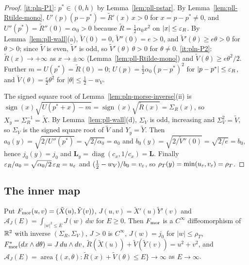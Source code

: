 \begin{proof}
\ref{it:pln-P1}: $p^*\in(0,h)$ by Lemma~\ref{lem:pll-pstar}. By Lemma~\ref{lem:pll-Rtilde-mono},
$U'(p)(p-p^*)=\tilde R'(x)\,x>0$ for $x=p-p^*\ne0$, and $U''(p^*)=\tilde R''(0)=\alpha_0>0$ because
$\tilde R=\frac12\alpha_0x^2$ on $|x|\le\varepsilon_R$. By Lemma~\ref{lem:pll-wall}(a), $\tilde V(0)=0$, $\tilde V''(0)=e>0$,
and $\tilde V'(\theta)\ge e\theta>0$ for $\theta>0$; since $\tilde V$ is even, $\tilde V'$ is odd, so
$\tilde V'(\theta)\,\theta>0$ for $\theta\ne0$. \ref{it:pln-P2}: $\tilde R(x)\to+\infty$ as $x\to\pm\infty$
(Lemma~\ref{lem:pll-Rtilde-mono}) and $\tilde V(\theta)\ge e\theta^2/2$. Further $m=U(p^*)=\tilde R(0)=0$;
$U(p)=\frac12\alpha_0(p-p^*)^2$ for $|p-p^*|\le\varepsilon_R$, and $\tilde V(\theta)=\frac e2\theta^2$ for $|\theta|\le\frac12-w_V$.

The signed square root of Lemma~\ref{lem:pln-morse-inverse}(ii) is
$\operatorname{sign}(x)\sqrt{U(p^*+x)-m}=\operatorname{sign}(x)\sqrt{\tilde R(x)}=\Sigma_R(x)$, so $X_y=\Sigma_R^{-1}=\tilde X$.
By Lemma~\ref{lem:pll-wall}(d), $\Sigma_V$ is odd, increasing and $\Sigma_V^2=\tilde V$, so $\Sigma_V$ is the signed square
root of $\tilde V$ and $Y_y=\tilde Y$. Then $a_0(y)=\sqrt{2/U''(p^*)}=\sqrt{2/\alpha_0}=a_0$ and
$b_0(y)=\sqrt{2/\tilde V''(0)}=\sqrt{2/e}=b_0$, hence $j_0(y)=j_0$ and $\mathbf L_y=\operatorname{diag}(c_x,1/c_x)=\mathbf L$.
Finally $\varepsilon_R/a_0=\sqrt{\alpha_0/2}\,\varepsilon_R=u_\varepsilon$ and $(\frac12-w_V)/b_0=v_\varepsilon$, so
$\rho_T(y)=\min(u_\varepsilon,v_\varepsilon)=\rho_T$.
\end{proof}

\subsection{The inner map}\label{sec:pll-inner-map}

\begin{lemma}\label{lem:pll-morse-density}
Put $F_{\rm mor}(u,v)=(\tilde X(u),\tilde Y(v))$, $J(u,v)=\tilde X'(u)\tilde Y'(v)$ and
$\mathcal A_J(E)=\int_{|w|^2\le E}J(w)\,dw$ for $E\ge0$. Then $F_{\rm mor}$ is a $C^\infty$ diffeomorphism of $\mathbb{R}^2$
with inverse $(\Sigma_R,\Sigma_V)$, $J>0$ is $C^\infty$, $J(w)=j_0$ for $|w|\le\rho_T$,
$F_{\rm mor}^*(dx\wedge d\theta)=J\,du\wedge dv$, $\tilde R(\tilde X(u))+\tilde V(\tilde Y(v))=u^2+v^2$, and
$\mathcal A_J(E)=\operatorname{area}\{(x,\theta):\tilde R(x)+\tilde V(\theta)\le E\}\to\infty$ as $E\to\infty$.
\end{lemma}

